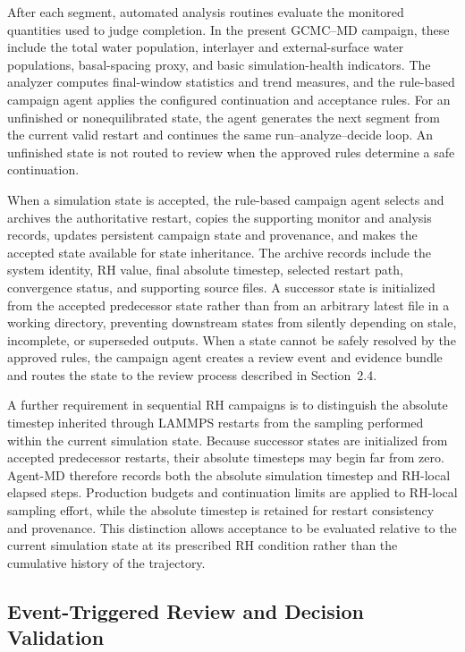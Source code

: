 After each segment, automated analysis routines evaluate the monitored quantities used to judge completion. In the present GCMC--MD campaign, these include the total water population, interlayer and external-surface water populations, basal-spacing proxy, and basic simulation-health indicators. The analyzer computes final-window statistics and trend measures, and the rule-based campaign agent applies the configured continuation and acceptance rules. For an unfinished or nonequilibrated state, the agent generates the next segment from the current valid restart and continues the same run--analyze--decide loop. An unfinished state is not routed to review when the approved rules determine a safe continuation.

When a simulation state is accepted, the rule-based campaign agent selects and archives the authoritative restart, copies the supporting monitor and analysis records, updates persistent campaign state and provenance, and makes the accepted state available for state inheritance. The archive records include the system identity, RH value, final absolute timestep, selected restart path, convergence status, and supporting source files. A successor state is initialized from the accepted predecessor state rather than from an arbitrary latest file in a working directory, preventing downstream states from silently depending on stale, incomplete, or superseded outputs. When a state cannot be safely resolved by the approved rules, the campaign agent creates a review event and evidence bundle and routes the state to the review process described in Section~2.4.

A further requirement in sequential RH campaigns is to distinguish the absolute timestep inherited through LAMMPS restarts from the sampling performed within the current simulation state. Because successor states are initialized from accepted predecessor restarts, their absolute timesteps may begin far from zero. Agent-MD therefore records both the absolute simulation timestep and RH-local elapsed steps. Production budgets and continuation limits are applied to RH-local sampling effort, while the absolute timestep is retained for restart consistency and provenance. This distinction allows acceptance to be evaluated relative to the current simulation state at its prescribed RH condition rather than the cumulative history of the trajectory.

\subsection{Event-Triggered Review and Decision Validation}

